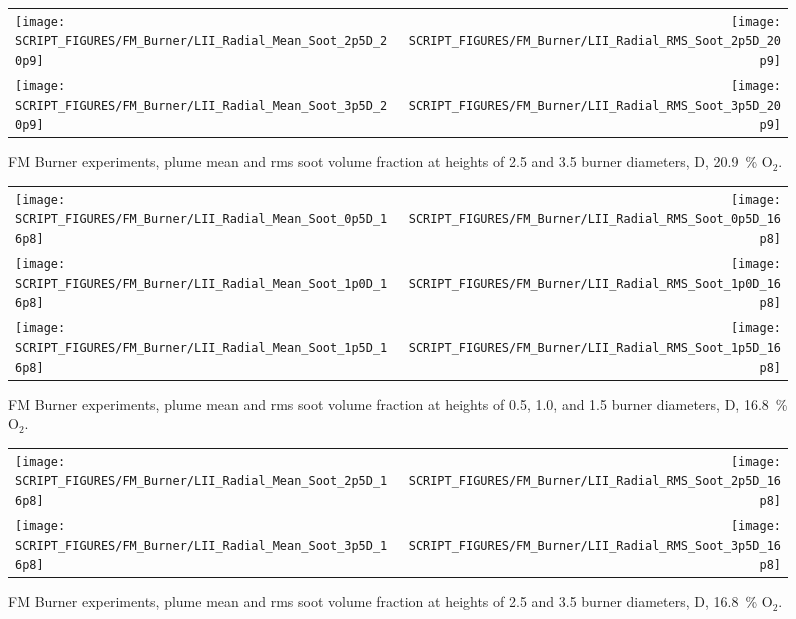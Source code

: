 \begin{figure}[p]
\begin{tabular*}{\textwidth}{l@{\extracolsep{\fill}}r}
\texttt{[image: SCRIPT\_FIGURES/FM\_Burner/LII\_Radial\_Mean\_Soot\_2p5D\_20p9]} &
\texttt{[image: SCRIPT\_FIGURES/FM\_Burner/LII\_Radial\_RMS\_Soot\_2p5D\_20p9]} \\
\texttt{[image: SCRIPT\_FIGURES/FM\_Burner/LII\_Radial\_Mean\_Soot\_3p5D\_20p9]} &
\texttt{[image: SCRIPT\_FIGURES/FM\_Burner/LII\_Radial\_RMS\_Soot\_3p5D\_20p9]}
\end{tabular*}
\caption[FM Burner experiments, plume mean and rms soot voiume fraction, 20.9~\% O$_2$]
{FM Burner experiments, plume mean and rms soot volume fraction at heights of 2.5 and 3.5 burner diameters, D, 20.9~\% O$_2$.}
\label{FM_Burner_Soot_2}
\end{figure}

\begin{figure}[!h]
\begin{tabular*}{\textwidth}{l@{\extracolsep{\fill}}r}
\texttt{[image: SCRIPT\_FIGURES/FM\_Burner/LII\_Radial\_Mean\_Soot\_0p5D\_16p8]} &
\texttt{[image: SCRIPT\_FIGURES/FM\_Burner/LII\_Radial\_RMS\_Soot\_0p5D\_16p8]} \\
\texttt{[image: SCRIPT\_FIGURES/FM\_Burner/LII\_Radial\_Mean\_Soot\_1p0D\_16p8]} &
\texttt{[image: SCRIPT\_FIGURES/FM\_Burner/LII\_Radial\_RMS\_Soot\_1p0D\_16p8]} \\
\texttt{[image: SCRIPT\_FIGURES/FM\_Burner/LII\_Radial\_Mean\_Soot\_1p5D\_16p8]} &
\texttt{[image: SCRIPT\_FIGURES/FM\_Burner/LII\_Radial\_RMS\_Soot\_1p5D\_16p8]}
\end{tabular*}
\caption[FM Burner experiments, plume mean and rms soot volume fraction, 16.8~\% O$_2$]
{FM Burner experiments, plume mean and rms soot volume fraction at heights of 0.5, 1.0, and 1.5 burner diameters, D, 16.8~\% O$_2$.}
\label{FM_Burner_Soot_3}
\end{figure}

\begin{figure}[p]
\begin{tabular*}{\textwidth}{l@{\extracolsep{\fill}}r}
\texttt{[image: SCRIPT\_FIGURES/FM\_Burner/LII\_Radial\_Mean\_Soot\_2p5D\_16p8]} &
\texttt{[image: SCRIPT\_FIGURES/FM\_Burner/LII\_Radial\_RMS\_Soot\_2p5D\_16p8]} \\
\texttt{[image: SCRIPT\_FIGURES/FM\_Burner/LII\_Radial\_Mean\_Soot\_3p5D\_16p8]} &
\texttt{[image: SCRIPT\_FIGURES/FM\_Burner/LII\_Radial\_RMS\_Soot\_3p5D\_16p8]}
\end{tabular*}
\caption[FM Burner experiments, plume mean and rms soot voiume fraction, 16.8~\% O$_2$]
{FM Burner experiments, plume mean and rms soot volume fraction at heights of 2.5 and 3.5 burner diameters, D, 16.8~\% O$_2$.}
\label{FM_Burner_Soot_4}
\end{figure}

